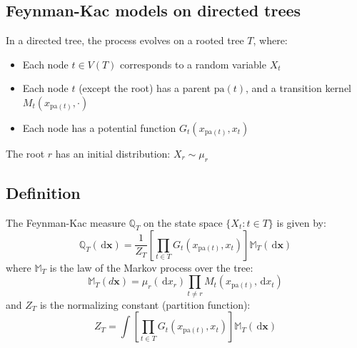 \documentclass[11pt,reqno]{amsart}
\newcommand{\dd}{{\,\mathrm d}}
\theoremstyle{definition}
\newcommand{\pa}{\mathrm{pa}}
\begin{document}
\subsection*{Feynman-Kac models on directed trees}

In a directed tree, the process evolves on a rooted tree \(T\), where:

\begin{itemize}
  \item Each node \(t \in V(T)\) corresponds to a random variable \(X_t\)
  \item Each node \(t\) (except the root) has a parent \(\pa(t)\), and a transition kernel \(M_t(x_{\pa(t)}, \cdot)\)
  \item Each node has a potential function \(G_t(x_{\pa(t)}, x_t)\)
\end{itemize}

The root \(r\) has an initial distribution: \(X_r \sim \mu_r\)

\subsection*{Definition}

The Feynman-Kac measure \(\mathbb{Q}_T\) on the state space \(\{X_t \colon t \in T\}\) is given by:
\[
\mathbb{Q}_T(\dd\mathbf{x}) = \frac{1}{Z_T} \left[ \prod_{t \in T} G_t(x_{\pa(t)}, x_t) \right] \mathbb{M}_T(\dd\mathbf{x})
\]
where \(\mathbb{M}_T\) is the law of the Markov process over the tree:
\[
\mathbb{M}_T(d\mathbf{x}) = \mu_r(\dd x_r) \prod_{t \neq r} M_t(x_{\pa(t)}, \dd x_t)
\]
and \(Z_T\) is the normalizing constant (partition function):
\[
Z_T = \int \left[ \prod_{t \in T} G_t(x_{\pa(t)}, x_t) \right] \mathbb{M}_T(\dd\mathbf{x})
\]



\end{document}
